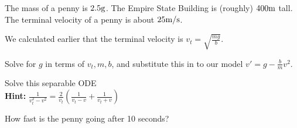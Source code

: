 \begin{applicationActivities}
\begin{observation}
The mass of a penny is \(2.5 {\rm g}\).  The Empire State Building is (roughly) \(400 {\rm m}\) tall.
\vfill
The terminal velocity of a penny is about \(25 {\rm m/s}\).
\end{observation}

\begin{activity}{20}
We calculated earlier that the terminal velocity is \(v_t = \sqrt{\frac{mg}{b}}\).  
\begin{subactivity}
Solve for \(g\) in terms of \(v_t,m,b\), and substitute this in to our model \(v'=g-\frac{b}{m}v^2\).
\end{subactivity}
\begin{subactivity}
Solve this separable ODE \\
\textbf{Hint:} \(\frac{1}{v_t^2-v^2}=\frac{2}{v_t}\left(\frac{1}{v_t-v}+\frac{1}{v_t+v}\right)\)
\end{subactivity}
\begin{subactivity}
How fast is the penny going after 10 seconds?
\end{subactivity}
\end{activity}



\end{applicationActivities}
